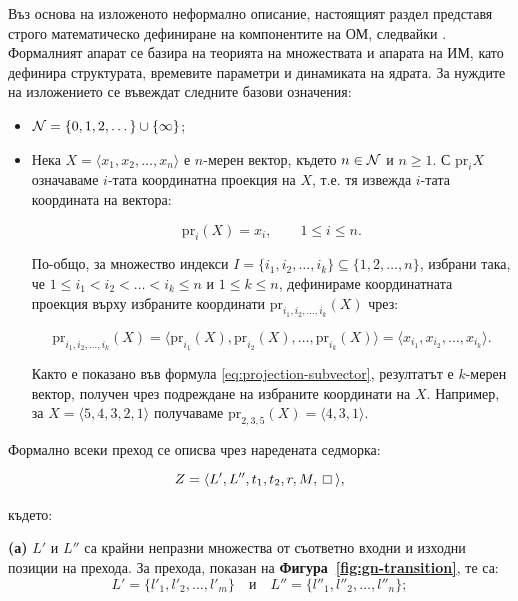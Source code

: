 \hspace*{2.5em}Въз основа на изложеното неформално описание, настоящият раздел представя строго математическо дефиниране на компонентите на ОМ, следвайки \cite{Z3}. Формалният апарат се базира на теорията на множествата и апарата на ИМ, като дефинира структурата, времевите параметри и динамиката на ядрата. За нуждите на изложението се въвеждат следните базови означения:

\begin{itemize}
	
	\item ${\cal N} = \lbrace 0, 1, 2, \dots \rbrace \cup \lbrace \infty \rbrace$;
	
	\item Нека $X=\langle x_1,x_2,\dots,x_n\rangle$ е $n$-мерен вектор, където
	$n \in {\cal N}$ и $n \ge 1$.
	С $\mbox{pr}_{i}X$ означаваме $i$-тата координатна проекция на $X$, т.е. тя извежда
	$i$-тата координата на вектора:

	\begin{equation}
	\mbox{pr}_{i}(X) = x_i,
	\qquad 1 \le i \le n .
	\label{eq:projection-single}
	\end{equation}

	По-общо, за множество индекси $I=\{i_1,i_2,\dots,i_k\}\subseteq \{1,2,\dots,n\}$,
	избрани така, че
	$1 \le i_1 < i_2 < \dots < i_k \le n$ и $1 \le k \le n$,
	дефинираме координатната проекция върху избраните координати
	$\mbox{pr}_{i_1,i_2,\dots,i_k}(X)$ чрез:

	\begin{equation}
	\mbox{pr}_{i_1,i_2,\dots,i_k}(X)
	=
	\langle \mbox{pr}_{i_1}(X), \mbox{pr}_{i_2}(X), \dots, \mbox{pr}_{i_k}(X) \rangle
	=
	\langle x_{i_1}, x_{i_2}, \dots, x_{i_k} \rangle .
	\label{eq:projection-subvector}
	\end{equation}

	Както е показано във формула \eqref{eq:projection-subvector}, резултатът е $k$-мерен вектор,
	получен чрез подреждане на избраните координати на $X$.
	Например, за $X=\langle 5,4,3,2,1\rangle$ получаваме
	$\mbox{pr}_{2,3,5}(X)=\langle 4,3,1\rangle$.
	
\end{itemize}

Формално всеки преход се описва чрез наредената седморка: 
$$ Z = \langle L', L'', t_{1}, t_{2}, r, M, \kv \rangle, $$ 

\newpage
където:

{\bf (а)} $L'$ и $L''$ са крайни непразни множества от съответно входни и изходни позиции на прехода. За прехода, показан на \textbf{Фигура~\ref{fig:gn-transition}}, те са:
$$ L' = \{ l'_{1}, l'_{2}, \dots, l'_{m} \} \quad \text{и} \quad L'' = \{ l''_{1}, l''_{2}, \dots, l''_{n} \}; $$

